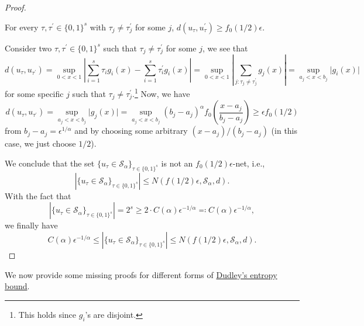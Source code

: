 \begin{proof}
	\begin{claim}
		For every \(\tau , \tau ^{\prime} \in \{ 0, 1 \}^s \) with \(\tau _j \neq \tau _j^{\prime} \) for some \(j\), \(d(u_{\tau } , u_{\tau} ^{\prime} ) \geq f_0(1 / 2) \epsilon \).
	\end{claim}
	\begin{explanation}
		Consider two \(\tau , \tau ^{\prime} \in \{ 0, 1 \} ^s\) such that \(\tau _j \neq \tau ^{\prime} _j\) for some \(j\), we see that
		\[
			d (u_{\tau } , u_{\tau ^{\prime} })
			= \sup _{0 < x < 1} \left\vert \sum_{i=1}^{s} \tau _i g_i (x) - \sum_{i=1}^{s} \tau ^{\prime} _i g_i (x) \right\vert
			= \sup _{0 < x < 1} \left\vert \sum_{j\colon \tau _j \neq \tau ^{\prime} _j} g_j(x) \right\vert
			= \sup _{a_j < x < b_j} \vert g_i(x) \vert
		\]
		for some specific \(j\) such that \(\tau _j \neq \tau _j ^{\prime} \).\footnote{This holds since \(g_i\)'s are disjoint.} Now, we have
		\[
			d (u_{\tau } , u_{\tau ^{\prime} })
			= \sup _{a_j < x < b_j} \vert g_j (x) \vert
			= \sup _{a_j < x < b_j} (b_j - a_j)^\alpha f_0 \left( \frac{x - a_j}{b_j - a_j} \right)
			\geq \epsilon f_0(1 / 2)
		\]
		from \(b_j - a_j = \epsilon ^{1 / \alpha }\) and by choosing some arbitrary \((x - a_j) / (b_j - a_j)\) (in this case, we just choose \(1 / 2\)).
	\end{explanation}
	We conclude that the set \(\{ u_{\tau } \in \mathcal{S} _\alpha  \}_{\tau \in \{ 0, 1 \} ^s} \) is not an \(f_0(1 / 2) \epsilon \)-net, i.e.,
	\[
		\left\vert \{ u_{\tau } \in \mathcal{S} _\alpha  \}_{\tau \in \{ 0, 1 \} ^s} \right\vert
		\leq N(f(1 / 2) \epsilon , \mathcal{S} _\alpha , d ).
	\]
	With the fact that
	\[
		\left\vert \{ u_{\tau } \in \mathcal{S} _\alpha  \}_{\tau \in \{ 0, 1 \} ^s} \right\vert
		= 2^s
		\geq 2\cdot C(\alpha )\epsilon ^{-1 / \alpha }
		\eqqcolon C(\alpha )\epsilon ^{-1 / \alpha },
	\]
	we finally have
	\[
		C(\alpha )\epsilon ^{-1 / \alpha }
		\leq \left\vert \{ u_{\tau } \in \mathcal{S} _\alpha  \}_{\tau \in \{ 0, 1 \} ^s} \right\vert
		\leq N(f(1 / 2) \epsilon , \mathcal{S} _\alpha , d ).
	\]
\end{proof}

We now provide some missing proofs for different forms of \hyperref[thm:Dudley-entropy-bound]{Dudley's entropy bound}.

